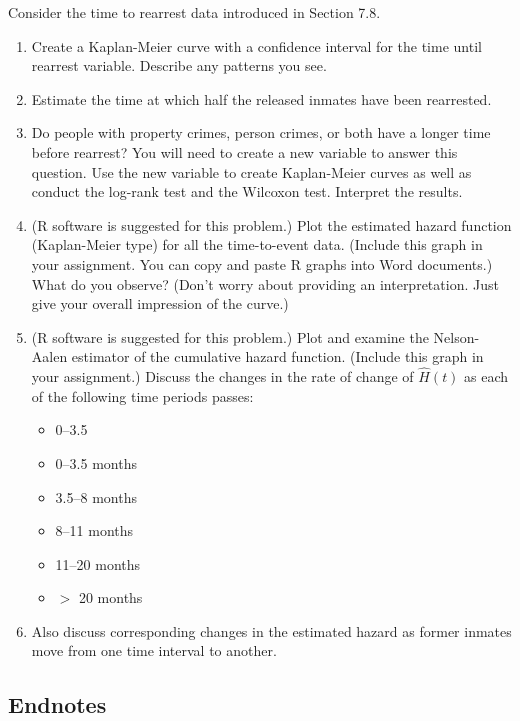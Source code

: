 \documentclass[
]{report}
\begin{document}
\begin{enumerate}
Consider the time to rearrest data introduced in Section 7.8.
  \begin{enumerate}
    \item Create a Kaplan-Meier curve with a confidence interval for the time until rearrest variable. Describe any patterns you see.
    \item Estimate the time at which half the released inmates have been rearrested.
    \item Do people with property crimes, person crimes, or both have a longer time before rearrest? You will need to create a new variable to answer this question. Use the new variable to create Kaplan-Meier curves as well as conduct the log-rank test and the Wilcoxon test. Interpret the results.
    \item (R software is suggested for this problem.) Plot the estimated hazard function (Kaplan-Meier type) for all the time-to-event data. (Include this graph in your assignment. You can copy and paste R graphs into Word documents.) What do you observe? (Don’t worry about providing an interpretation. Just give your overall impression of the curve.)
    \item (R software is suggested for this problem.) Plot and examine the Nelson-Aalen estimator of the cumulative hazard function. (Include this graph in your assignment.) Discuss the changes in the rate of change of $\scriptstyle \widehat{H}(t)$ as each of the following time periods passes:
      \begin{itemize}
        \item 0–3.5
        \item 0–3.5 months
        \item 3.5–8 months
        \item 8–11 months
        \item 11–20 months
        \item $\scriptstyle >$ 20 months
      \end{itemize}
    \item[] Also discuss corresponding changes in the estimated hazard as former inmates move from one time interval to another.
  \end{enumerate}

\end{enumerate}

\hypertarget{endnotes}{%
\subsection*{Endnotes}\label{endnotes}}
\end{document}
